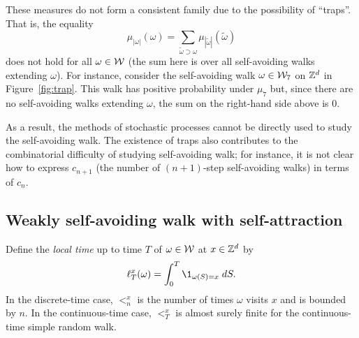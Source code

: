 These measures do not form a consistent family due to the possibility of ``traps''. That is, the equality
\begin{equation}
\mu_{|\omega|}(\omega) = \sum_{\tilde\omega \supset \omega} \mu_{|\tilde\omega|}(\tilde\omega)
\end{equation}
does not hold for all $\omega\in\mathcal{W}$ (the sum here is over all self-avoiding walks extending $\omega$).
For instance, consider the self-avoiding walk $\omega\in\mathcal{W}_7$ on ${ {{\mathbb Z}}^d }$ in
Figure~\ref{fig:trap}. This walk has positive probability under $\mu_7$ but,
since there are no self-avoiding walks extending $\omega$, the sum on the right-hand side above is $0$.

As a result, the methods of stochastic processes cannot be directly used to study the self-avoiding walk. The existence of traps also contributes to the combinatorial difficulty of studying self-avoiding walk; for instance, it is not clear how to express $c_{n+1}$ (the number of $(n+1)$-step self-avoiding walks) in terms of $c_n$.



\subsection{Weakly self-avoiding walk with self-attraction}

Define the \emph{local time} up to time $T$ of $\omega \in \mathcal{W}$ at
$x \in { {{\mathbb Z}}^d }$ by
\begin{equation}
\lt^x_T(\omega) = \int_0^T \1_{\omega(S)=x} \; dS.
\end{equation}
In the discrete-time case, $\lt^x_n$ is the number of times $\omega$ visits $x$
and is bounded by $n$. In the continuous-time case, $\lt^x_T$ is almost surely
finite for the continuous-time simple random walk.

